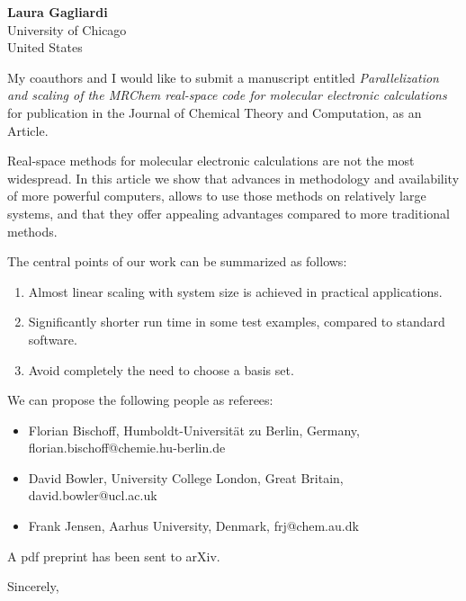 \documentclass[
    sender,
    paper=a4,
    version=last,
    fontsize=11pt,
    DIV=13,
    BCOR=0mm]{scrlttr2}
\begin{document}

\begin{acronym}
\end{acronym}

\newcommand{\mrchem}{\href{https://github.com/MRChemSoft/mrchem}{\textsc{MRChem}}}
\newcommand{\lsdalton}{\href{http://www.daltonprogram.org/}{\textsc{LSDalton}}}
\newcommand{\bestguess}{\href{https://github.com/MRChemSoft/best-guess}{\textsc{bestguess}}}
\newcommand{\blob}{\href{https://github.com/densities/blob}{\textsc{blob}}}
\newcommand{\gautogrid}{\href{https://github.com/dgasmith/gau2grid/blob/master/docs/source/index.rst}{\textsc{gau2grid}}}

\begin{letter}{
    \textbf{Laura Gagliardi} \\
    University of Chicago \\
    United States
  }
\opening{}

My coauthors and I would like to submit a manuscript entitled 
\emph{Parallelization and scaling of the MRChem real-space code for molecular electronic calculations}
for publication in the Journal of Chemical Theory and Computation, as an Article.

Real-space methods for molecular electronic calculations are not the most widespread. In this article we show that advances in methodology and availability of more powerful computers, allows to use those methods on relatively large systems, and that they offer appealing advantages compared to more traditional methods.


The central points of our work can be summarized as follows:
\begin{enumerate}
\item Almost linear scaling with system size is achieved in practical applications.
\item Significantly shorter run time in some test examples, compared to standard software.
\item Avoid completely the need to choose a basis set.
\end{enumerate}

We can propose the following people as referees:
\begin{itemize}
    \item Florian Bischoff, 
    Humboldt-Universität zu Berlin, Germany, 
    florian.bischoff@chemie.hu-berlin.de
    \item David Bowler,
    University College London, Great Britain,
    david.bowler@ucl.ac.uk
    \item Frank Jensen,
    Aarhus University, Denmark,
    frj@chem.au.dk
\end{itemize}

A pdf preprint has been sent to arXiv.

\closing{Sincerely,} 
\end{letter}
\end{document}
